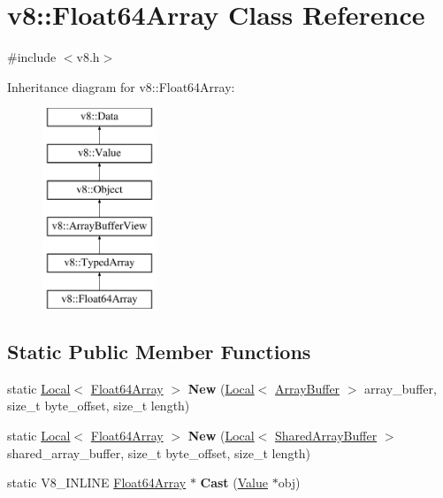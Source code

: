 \hypertarget{classv8_1_1Float64Array}{}\section{v8\+:\+:Float64\+Array Class Reference}
\label{classv8_1_1Float64Array}


{\ttfamily \#include $<$v8.\+h$>$}

Inheritance diagram for v8\+:\+:Float64\+Array\+:\begin{figure}[H]
\begin{center}
\leavevmode
\includegraphics[height=6.000000cm]{classv8_1_1Float64Array}
\end{center}
\end{figure}
\subsection*{Static Public Member Functions}
\begin{DoxyCompactItemize}
\item 
static \hyperlink{classv8_1_1Local}{Local}$<$ \hyperlink{classv8_1_1Float64Array}{Float64\+Array} $>$ {\bfseries New} (\hyperlink{classv8_1_1Local}{Local}$<$ \hyperlink{classv8_1_1ArrayBuffer}{Array\+Buffer} $>$ array\+\_\+buffer, size\+\_\+t byte\+\_\+offset, size\+\_\+t length)\hypertarget{classv8_1_1Float64Array_a6e12e5ced578a357cfd049e036c4d6d6}{}\label{classv8_1_1Float64Array_a6e12e5ced578a357cfd049e036c4d6d6}

\item 
static \hyperlink{classv8_1_1Local}{Local}$<$ \hyperlink{classv8_1_1Float64Array}{Float64\+Array} $>$ {\bfseries New} (\hyperlink{classv8_1_1Local}{Local}$<$ \hyperlink{classv8_1_1SharedArrayBuffer}{Shared\+Array\+Buffer} $>$ shared\+\_\+array\+\_\+buffer, size\+\_\+t byte\+\_\+offset, size\+\_\+t length)\hypertarget{classv8_1_1Float64Array_aff414a8613e468f7deb29996f049e130}{}\label{classv8_1_1Float64Array_aff414a8613e468f7deb29996f049e130}

\item 
static V8\+\_\+\+I\+N\+L\+I\+NE \hyperlink{classv8_1_1Float64Array}{Float64\+Array} $\ast$ {\bfseries Cast} (\hyperlink{classv8_1_1Value}{Value} $\ast$obj)\hypertarget{classv8_1_1Float64Array_a936ee8e8cb2cb892cc5369e3ee6a7784}{}\label{classv8_1_1Float64Array_a936ee8e8cb2cb892cc5369e3ee6a7784}

\end{DoxyCompactItemize}
